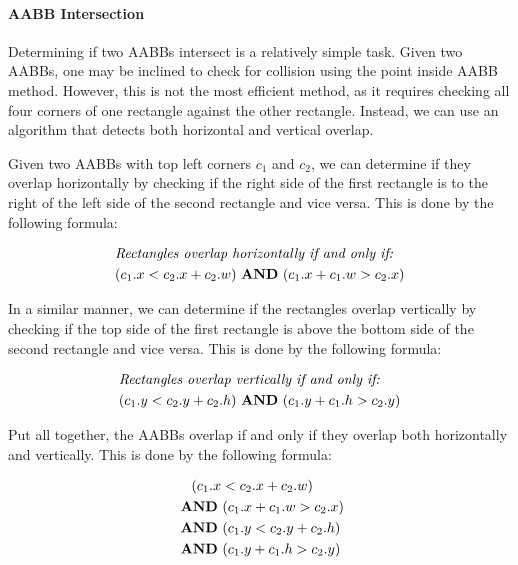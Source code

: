 \documentclass{article}
\renewcommand{\land}{\,\,\textrm{\textbf{AND}}\,\,}
\begin{document}
\newpage
\paragraph*{AABB Intersection}

Determining if two AABBs intersect is a relatively simple task. Given two
AABBs, one may be inclined to check for collision using the point inside AABB
method. However, this is not the most efficient method, as it requires checking
all four corners of one rectangle against the other rectangle. Instead, we can
use an algorithm that detects both horizontal and vertical overlap.

Given two AABBs with top left corners $c_1$ and $c_2$, we can determine if they
overlap horizontally by checking if the right side of the first rectangle is to
the right of the left side of the second rectangle and vice versa. This is done
by the following formula:

\begin{equation}
    \begin{aligned}
         & \textit{Rectangles overlap horizontally if and only if:} \\
         & (c_1.x < c_2.x + c_2.w) \land (c_1.x + c_1.w > c_2.x)
    \end{aligned}
\end{equation}

In a similar manner, we can determine if the rectangles overlap vertically by
checking if the top side of the first rectangle is above the bottom side of the
second rectangle and vice versa. This is done by the following formula:

\begin{equation}
    \begin{aligned}
         & \textit{Rectangles overlap vertically if and only if:} \\
         & (c_1.y < c_2.y + c_2.h) \land (c_1.y + c_1.h > c_2.y)
    \end{aligned}
\end{equation}

Put all together, the AABBs overlap if and only if they overlap both
horizontally and vertically. This is done by the following formula:

\begin{equation}
    \begin{aligned}
         & \hspace{1.1em} (c_1.x < c_2.x + c_2.w) \\
         & \land (c_1.x + c_1.w > c_2.x)          \\
         & \land (c_1.y < c_2.y + c_2.h)          \\
         & \land (c_1.y + c_1.h > c_2.y)
    \end{aligned}
\end{equation}
\end{document}
